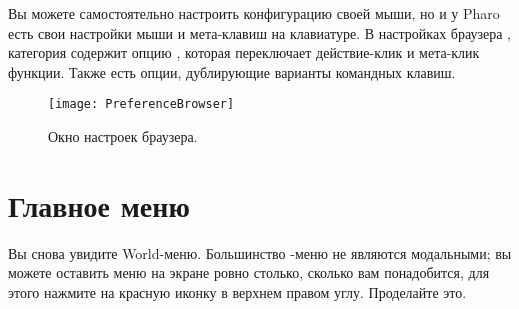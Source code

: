 \documentclass[a4paper,10pt,twoside]{book}
\begin{document}

Вы можете самостоятельно настроить конфигурацию своей мыши,
но и у Pharo есть свои настройки мыши и мета-клавиш на клавиатуре.
В настройках браузера , категория  содержит
опцию , которая переключает
действие-клик и мета-клик функции. Также есть опции, дублирующие
варианты командных клавиш. 

\begin{figure}[htb]
\centerline{\texttt{[image: PreferenceBrowser]}}
\caption{Окно настроек браузера.}
\end{figure}



\section{Главное меню}



Вы снова увидите World-меню. Большинство \pharo-меню
не являются модальными; вы можете оставить меню на экране
ровно столько, сколько вам понадобится, для этого нажмите на
красную иконку в верхнем правом углу. Проделайте это. 
\end{document}

